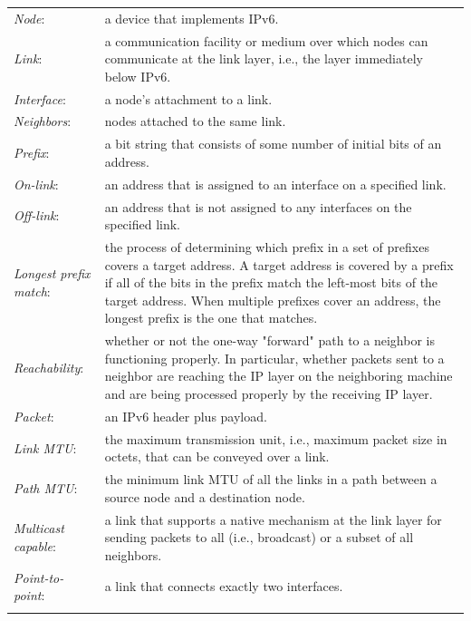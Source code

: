 \documentclass[12pt]{article}
\begin{document}
\begin{tabular}{L{3.3cm}L{11.2cm}}
\hdashline
\textit{Node}:&a device that implements IPv6.\\
\hdashline
\textit{Link}:&a communication facility or medium over which nodes can communicate at the link layer, i.e., the layer immediately below IPv6.\\
\hdashline
\textit{Interface}:&a node's attachment to a link.\\
\hdashline
\textit{Neighbors}:&nodes attached to the same link.\\
\hdashline
\textit{Prefix}:&a bit string that consists of some number of initial bits of an address.\\
\hdashline
\textit{On-link}:&an address that is assigned to an interface on a specified link.\\
\hdashline
\textit{Off-link}:&an address that is not assigned to any interfaces on the specified link.\\
\hdashline
\textit{Longest prefix match}:&the process of determining which prefix in a set of prefixes covers a target address. A target address is covered by a prefix if all of the bits in the prefix match the left-most 
bits of the target address. When multiple prefixes cover an address, the longest prefix is the one that matches.\\
\hdashline
\textit{Reachability}:&whether or not the one-way "forward" path to a neighbor is functioning properly. In particular, whether packets sent to a neighbor are reaching the IP layer on the neighboring machine and are 
being processed properly by the receiving IP layer.\\
\hdashline
\textit{Packet}:&an IPv6 header plus payload.\\
\hdashline
\textit{Link MTU}:&the maximum transmission unit, i.e., maximum packet size in octets, that can be conveyed over a link.\\
\hdashline
\textit{Path MTU}:&the minimum link MTU of all the links in a path between a source node and a destination node.\\
\hdashline
\textit{Multicast capable}:&a link that supports a native mechanism at the link layer for sending packets to all (i.e., broadcast) or a subset of all neighbors.\\
\hdashline
\textit{Point-to-point}:&a link that connects exactly two interfaces.\\
\hdashline
\end{tabular}
\end{document}
